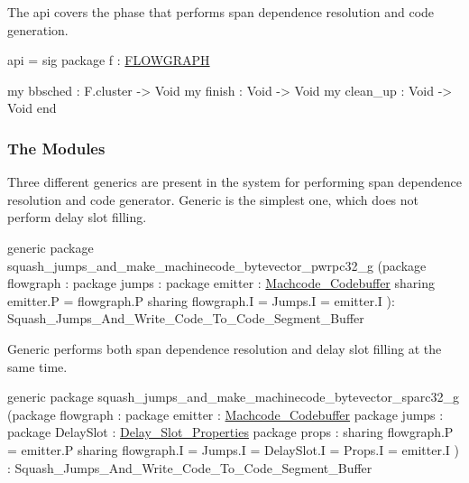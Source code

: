 The  api covers the phase that performs
span dependence resolution and code generation.
\begin{SML}
api  = sig
  package f : \href{cluster.html}{FLOWGRAPH}

  my bbsched : F.cluster -> Void
  my finish : Void -> Void
  my clean_up : Void -> Void
end
\end{SML}

\subsubsection{The Modules}

Three different generics are present in the \MLRISC{} system for
performing span dependence resolution and code generator.
Generic  is the simplest one, which does not perform
delay slot filling.
\begin{SML}
generic package squash_jumps_and_make_machinecode_bytevector_pwrpc32_g
  (package flowgraph : 
   package jumps : 
   package emitter : \href{mc.html}{Machcode_Codebuffer}
     sharing emitter.P = flowgraph.P
     sharing flowgraph.I = Jumps.I = emitter.I
  ): Squash_Jumps_And_Write_Code_To_Code_Segment_Buffer 
\end{SML}

Generic  performs both span dependence
resolution and delay slot filling at the same time.
\begin{SML}
generic package squash_jumps_and_make_machinecode_bytevector_sparc32_g
  (package flowgraph : 
   package emitter : \href{mc.html}{Machcode_Codebuffer}
   package jumps : 
   package DelaySlot : \href{delayslots.html}{Delay_Slot_Properties}
   package props : 
     sharing flowgraph.P = emitter.P
     sharing flowgraph.I = Jumps.I = DelaySlot.I = Props.I = emitter.I
  ) : Squash_Jumps_And_Write_Code_To_Code_Segment_Buffer 
\end{SML}

